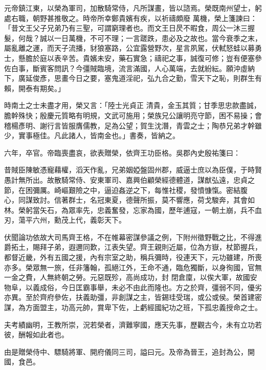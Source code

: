 \begin{pinyinscope}
 元帝鎮江東，以榮為軍司，加散騎常侍，凡所謀畫，皆以諮焉。榮既南州望士，躬處右職，朝野甚推敬之。時帝所幸鄭貴嬪有疾，以祈禱頗廢
 萬機，榮上箋諫曰：「昔文王父子兄弟乃有三聖，可謂窮理者也。而文王日昃不暇食，周公一沐三握髮，何哉？誠以一日萬機，不可不理；一言蹉跌，患必及之故也。當今衰季之末，屬亂離之運，而天子流播，豺狼塞路，公宜露營野次，星言夙駕，伏軾怒蛙以募勇士，懸膽於庭以表辛苦。貴嬪未安，藥石實急；禱祀之事，誠復可修；豈有便塞參佐白事，斷賓客問訊？今彊賊臨境，流言滿國，人心萬端，去就紛紜。願沖虛納下，廣延俊彥，思畫今日之要，塞鬼道淫祀，弘九合之勤，雪天下之恥，則群生有賴，開泰有期矣。」



 時南土之士未盡才用，榮又言：「陸士光貞正
 清貴，金玉其質；甘季思忠款盡誠，膽幹殊快；殷慶元質略有明規，文武可施用；榮族兄公讓明亮守節，困不易操；會稽楊彥明、謝行言皆服膺儒教，足為公望；賀生沈潛，青雲之士；陶恭兄弟才幹雖少，實事極佳。凡此諸人，皆南金也。」書奏，皆納之。



 六年，卒官。帝臨喪盡哀，欲表贈榮，依齊王功臣格。吳郡內史殷祐箋曰：



 昔賊臣陳敏憑寵藉權，滔天作亂，兄弟姻婭盤固州郡，威逼士庶以為臣僕，于時賢愚計無所出。故散騎常侍、安東軍司、嘉興伯顧榮經德體道，謀猷弘遠，忠貞之節，在困彌厲。崎嶇艱險之中，逼迫姦逆之下，每惟社稷，發憤慷愾。密結腹
 心，同謀致討。信著群士，名冠東夏，德聲所振，莫不響應，荷戈駿奔，其會如林。榮躬當矢石，為眾率先，忠義奮發，忘家為國，歷年逋寇，一朝土崩，兵不血刃，蕩平六州，勳茂上代，義彰天下。



 伏聞論功依故大司馬齊王格，不在帷幕密謀參議之例，下附州徵野戰之比，不得進爵拓土，賜拜子弟，遐邇同歎，江表失望。齊王親則近屬，位為方嶽，杖節握兵，都督近畿，外有五國之援，內有宗室之助，稱兵彌時，役連天下，元功雖建，所喪亦多。榮眾無一旅，任非籓翰，孤絕江外，王命不通，臨危獨斷，以身徇國，官無一金之費，人無終朝之勞。元惡既殄，高尚成功，封
 閉倉廩，以俟大軍，故國安物阜，以義成俗，今日匡霸事舉，未必不由此而隆也。方之於齊，彊弱不同，優劣亦異。至於齊府參佐，扶義助彊，非創謀之主，皆錫珪受瑞，或公或侯。榮首建密謀，為方面盟主，功高元帥，賞卑下佐，上虧經國紀功之班，下孤忠義授命之士。



 夫考績幽明，王教所崇，況若榮者，濟難寧國，應天先事，歷觀古今，未有立功若彼，酬報如此者也。



 由是贈榮侍中、驃騎將軍、開府儀同三司，謚曰元。及帝為晉王，追封為公，開國，食邑。




\end{pinyinscope}
